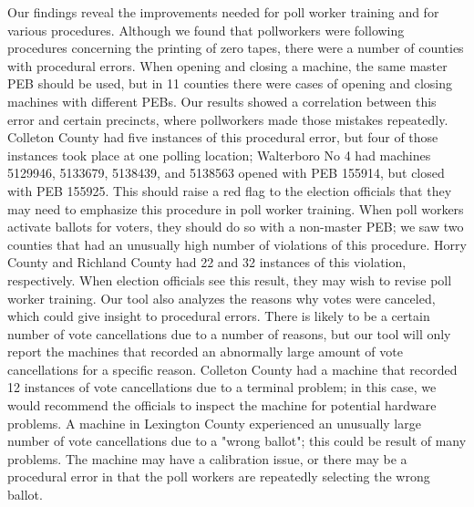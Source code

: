 Our findings reveal the improvements needed for poll worker training and for various procedures.  Although we found that pollworkers were following procedures concerning the printing of zero tapes, there were a number of counties with procedural errors.  When opening and closing a machine, the same master PEB should be used, but in 11 counties there were cases of opening and closing machines with different PEBs.  Our results showed a correlation between this error and certain precincts, where pollworkers made those mistakes repeatedly.  Colleton County had five instances of this procedural error, but four of those instances took place at one polling location; Walterboro No 4 had machines 5129946, 5133679, 5138439, and 5138563 opened with PEB 155914, but closed with PEB 155925.  This should raise a red flag to the election officials that they may need to emphasize this procedure in poll worker training.  When poll workers activate ballots for voters, they should do so with a non-master PEB; we saw two counties that had an unusually high number of violations of this procedure.  Horry County and Richland County had 22 and 32 instances of this violation, respectively.  When election officials see this result, they may wish to revise poll worker training.  Our tool also analyzes the reasons why votes were canceled, which could give insight to procedural errors.  There is likely to be a certain number of vote cancellations due to a number of reasons, but our tool will only report the machines that recorded an abnormally large amount of vote cancellations for a specific reason.  Colleton County had a machine that recorded 12 instances of vote cancellations due to a terminal problem; in this case, we would recommend the officials to inspect the machine for potential hardware problems.  A machine in Lexington County experienced an unusually large number of vote cancellations due to a "wrong ballot"; this could be result of many problems.  The machine may have a calibration issue, or there may be a procedural error in that the poll workers are repeatedly selecting the wrong ballot.
